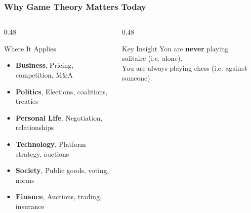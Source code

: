 \begin{frame}[fragile]\frametitle{Why Game Theory Matters Today}
  \begin{columns}
    \begin{column}[T]{0.48\linewidth}
      \begin{block}{Where It Applies}
        \begin{itemize}
          \item \textbf{Business}, Pricing, competition, M\&A
          \item \textbf{Politics}, Elections, coalitions, treaties
          \item \textbf{Personal Life}, Negotiation, relationships
          \item \textbf{Technology}, Platform strategy, auctions
          \item \textbf{Society}, Public goods, voting, norms
          \item \textbf{Finance}, Auctions, trading, insurance
        \end{itemize}
      \end{block}
    \end{column}
    \begin{column}[T]{0.48\linewidth}
      \begin{alertblock}{Key Insight}
        You are \textbf{never} playing solitaire (i.e. alone).\\
        You are always playing chess (i.e. against someone).
      \end{alertblock}
    \end{column}
  \end{columns}
\end{frame}

